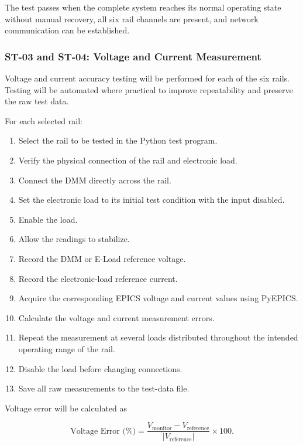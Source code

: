 The test passes when the complete system reaches its normal operating state without
manual recovery, all six rail channels are present, and network communication can
be established.

\subsubsection{ST-03 and ST-04: Voltage and Current Measurement}

Voltage and current accuracy testing will be performed for each of the six rails.
Testing will be automated where practical to improve repeatability and preserve the
raw test data.

For each selected rail:

\begin{enumerate}
    \item Select the rail to be tested in the Python test program.
    \item Verify the physical connection of the rail and electronic load.
    \item Connect the DMM directly across the rail.
    \item Set the electronic load to its initial test condition with the input disabled.
    \item Enable the load.
    \item Allow the readings to stabilize.
    \item Record the DMM or E-Load reference voltage.
    \item Record the electronic-load reference current.
    \item Acquire the corresponding EPICS voltage and current values using PyEPICS.
    \item Calculate the voltage and current measurement errors.
    \item Repeat the measurement at several loads distributed throughout the intended
    operating range of the rail.
    \item Disable the load before changing connections.
    \item Save all raw measurements to the test-data file.
\end{enumerate}

Voltage error will be calculated as

\begin{equation}
    \text{Voltage Error (\%)} =
    \frac{V_{\text{monitor}}-V_{\text{reference}}}
    {|V_{\text{reference}}|}
    \times 100.
\end{equation}

